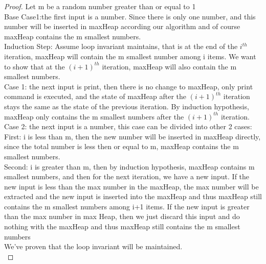 \documentclass[10pt]{article}
\begin{document}
\begin{proof}
Let m be a random number greater than or equal to 1\\
Base Case1:the first input is a number. Since there is only one number, and this number will be inserted in maxHeap according our algorithm and of course maxHeap contains the m smallest numbers.\\
Induction Step: Assume loop invariant maintains, that is at the end of the $i^{th}$ iteration, maxHeap will contain the m smallest number among i items. We want to show that at the $(i+1)^{th}$ iteration, maxHeap will also contain the m smallest numbers.\\
Case 1: the next input is print, then there is no change to maxHeap, only print command is executed, and the state of maxHeap after the $(i+1)^{th}$ iteration stays the same as the state of the previous iteration. By induction hypothesis, maxHeap only contains the m smallest numbers after the $(i+1)^{th}$ iteration.\\
Case 2: the next input is a number, this case can be divided into other 2 cases:\\
First: i is less than m, then the new number will be inserted in maxHeap directly, since the total number is less then or equal to m, maxHeap contains the m smallest numbers.\\
Second: i is greater than m, then by induction hypothesis, maxHeap contains m smallest numbers, and then for the next iteration, we have a new input. If the new input is less than the max number in the maxHeap, the max number will be extracted and the new input is inserted into the maxHeap and thus maxHeap still contains the m smallest numbers among i+1 items. If the new input is greater than the max number in max Heap, then we just discard this input and do nothing with the maxHeap and thus maxHeap still contains the m smallest numbers\\
We've proven that the loop invariant will be maintained.\\
\end{proof}
\end{document}
